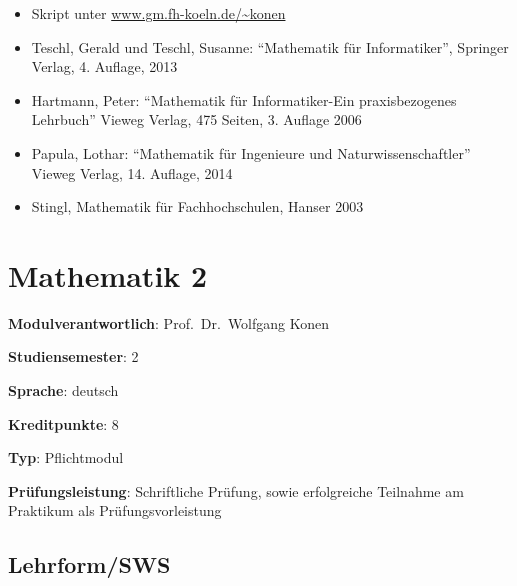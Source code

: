 \begin{itemize}
\tightlist
\item
  Skript unter
  \href{http://www.gm.fh-koeln.de/~konen}{www.gm.fh-koeln.de/\textasciitilde konen}
\item
  Teschl, Gerald und Teschl, Susanne: ``Mathematik für Informatiker'',
  Springer Verlag, 4. Auflage, 2013
\item
  Hartmann, Peter: ``Mathematik für Informatiker-Ein praxisbezogenes
  Lehrbuch'' Vieweg Verlag, 475 Seiten, 3. Auflage 2006
\item
  Papula, Lothar: ``Mathematik für Ingenieure und Naturwissenschaftler''
  Vieweg Verlag, 14. Auflage, 2014
\item
  Stingl, Mathematik für Fachhochschulen, Hanser 2003
\end{itemize}

\hypertarget{mathematik-2pathlabelmi-2017modulbeschreibungen-bachelorba_mathematik2}{%
\chapter{Mathematik
2\label{/mi-2017/modulbeschreibungen-bachelor/BA_Mathematik2}}\label{mathematik-2pathlabelmi-2017modulbeschreibungen-bachelorba_mathematik2}}

\begin{modulHead}
\textbf{Modulverantwortlich}: Prof.~Dr.~Wolfgang
Konen
\end{modulHead}
\begin{modulHead}
\textbf{Studiensemester}:
2
\end{modulHead}
\begin{modulHead}
\textbf{Sprache}:
deutsch
\end{modulHead}
\begin{modulHead}
\textbf{Kreditpunkte}:
8
\end{modulHead}
\begin{modulHead}
\textbf{Typ}:
Pflichtmodul
\end{modulHead}
\begin{modulHead}
\textbf{Prüfungsleistung}:
Schriftliche Prüfung, sowie erfolgreiche Teilnahme am Praktikum als
Prüfungsvorleistung
\end{modulHead}


\hypertarget{lehrformswspathlabelmi-2017modulbeschreibungen-bachelorba_mathematik2}{%
\section*{Lehrform/SWS\label{/mi-2017/modulbeschreibungen-bachelor/BA_Mathematik2}}\label{lehrformswspathlabelmi-2017modulbeschreibungen-bachelorba_mathematik2}}

